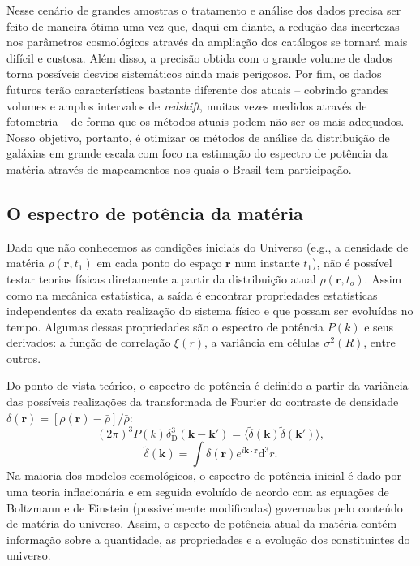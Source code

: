 \documentclass[12pt,a4paper]{article}
\begin{document}
Nesse cenário de grandes amostras o tratamento e análise dos dados precisa ser 
feito de maneira ótima uma vez que, daqui em diante, a redução das incertezas 
nos parâmetros cosmológicos através da ampliação dos catálogos se tornará mais 
difícil e custosa. Além disso, a precisão obtida com o grande volume de dados 
torna possíveis desvios sistemáticos ainda mais perigosos. Por fim, os dados 
futuros terão características bastante diferente dos atuais -- cobrindo grandes 
volumes e amplos intervalos de \emph{redshift}, muitas vezes medidos através de fotometria -- 
de forma que os métodos atuais podem não ser os mais adequados. Nosso objetivo, 
portanto, é otimizar os métodos de análise da distribuição de galáxias em grande 
escala com foco na estimação do espectro de potência da matéria através de 
mapeamentos nos quais o Brasil tem participação. 

\subsection{O espectro de potência da matéria}

Dado que não conhecemos as condições iniciais do Universo (e.g., a densidade 
de matéria $\rho(\mathbf{r},t_1)$ em cada ponto do espaço $\mathbf{r}$ num 
instante $t_1$), não é possível testar teorias físicas diretamente a partir 
da distribuição atual $\rho(\mathbf{r},t_o)$. Assim como na mecânica estatística, 
a saída é encontrar propriedades estatísticas independentes da exata realização 
do sistema físico e que possam ser evoluídas no tempo. Algumas dessas propriedades 
são o espectro de potência $P(k)$ e seus derivados: a função de correlação 
$\xi(r)$, a variância em células $\sigma^2(R)$, entre outros. 

Do ponto de vista teórico, o espectro de potência é definido a partir da variância 
das possíveis realizações da transformada de Fourier do contraste de densidade 
$\delta(\mathbf{r})=[\rho(\mathbf{r})-\bar{\rho}]/\bar{\rho}$:
\begin{equation}
(2\pi)^3P(k)\delta_{\mathrm{D}}^3(\mathbf{k}-\mathbf{k'})=
\langle\tilde{\delta}(\mathbf{k})\tilde{\delta}(\mathbf{k'})\rangle,
\end{equation}
\begin{equation}
\tilde{\delta}(\mathbf{k})=\int\delta(\mathbf{r})e^{i\mathbf{k}\cdot\mathbf{r}}\mathrm{d^3}r.
\end{equation}
Na maioria dos modelos cosmológicos, o espectro de potência inicial é dado por 
uma teoria inflacionária e em seguida evoluído de acordo com as equações de Boltzmann e de 
Einstein (possivelmente modificadas) governadas pelo conteúdo de matéria do universo. 
Assim, o especto de potência atual da matéria contém informação sobre a quantidade, 
as propriedades e a evolução dos constituintes do universo.
\end{document}
